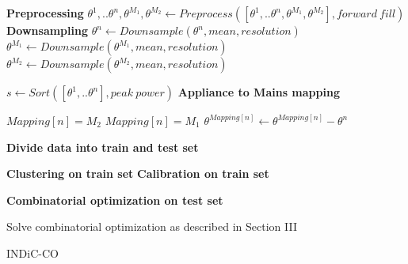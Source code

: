 \documentclass[conference]{IEEEtran}
\begin{document}
\begin{algorithm}
\DontPrintSemicolon %
\BlankLine
\textbf{Preprocessing}\;
\BlankLine
\nl$\theta^1,..\theta^n,\theta^{M_1},\theta^{M_2} \gets Preprocess([\theta^1,..\theta^n,\theta^{M_1},\theta^{M_2}],forward\: fill)$\;
\BlankLine
\textbf{Downsampling}
\BlankLine
\nl {}
	{
	$\theta^n \gets Downsample(\theta^n,mean,resolution)$\;
	}
\nl $\theta^{M_1} \gets Downsample(\theta^{M_1},mean,resolution)$\;
\nl $\theta^{M_2} \gets Downsample(\theta^{M_2},mean,resolution)$\;


\nl $s \gets Sort([\theta^1,..\theta^n],peak\: power)$\;
\BlankLine
\textbf{Appliance to Mains mapping}\;
\BlankLine
\nl {}
	{
	
\nl	{} 
		{ $Mapping[n]=M_2$\;		
		}  
\nl	{}
		{ $Mapping[n]=M_1$\;
		}
\nl	{}
	\nl	$\theta^{Mapping[n]} \gets \theta^{Mapping[n]} - \theta^n $ \;
	}
	\BlankLine
	\textbf{Divide data into train and test set}\;
	\BlankLine
	
		
		\BlankLine
		\textbf{Clustering on train set}\;
		\BlankLine
	\nl	{}
	\BlankLine
	\textbf{Calibration on train set} \;
	\BlankLine
\nl	{}


\BlankLine
\textbf{Combinatorial optimization on test set} \;
\BlankLine	
	
\nl Solve combinatorial optimization as described in Section III

\nl {}\;
\caption{INDiC-CO}
\label{algo:main}
\end{algorithm}
\end{document}
